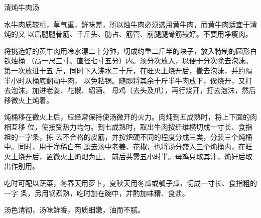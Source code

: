 \begin{recipe}{清炖牛肉汤}

\ingredients


\preparation

水牛肉质较粗，草气重，鲜味差，所以烛牛肉必须选用黄牛肉，而黄牛肉适宜于清炖的又
以后腿腿骨筋、千斤头、肋占、筋管、前腿腿骨筋较好。不要用净瘦肉。

将挑选好的黄牛肉用冷水漂二十分钟，切成约重二斤半的块子，放入特制的圆形白铁烛桶
（高一尺三寸、直径七寸五分）内。须分次放入，以便于分次除去泡沫。第一次放进十五
斤，同时下入沸水二十斤，在旺火上烧开后，撇去泡沫，并约隔半小时从桶底翻动牛肉，
以免粘锅。随即将其余十斤半牛肉放下，俟烧开，又打去泡沫，加进老姜、花椒、绍酒、
母鸡（去头及爪），再行烧开，打去泡沫，然后移微火上炖着。

炖桶移在微火上后，应经常保持使汤微开的火力。肉炖到五成熟时，将上下面的肉相互移
位，使接受热力均匀。到七成熟时，取出牛肉按纤维横切成一寸长、食指祖的一字条，拣
去不合格的皮筋，并按𤆵硬不同的程度分成三类，分装三个炖桶中。同时，用干净稀白布
滤去汤中老姜、花椒，也将汤分盛入三个炖桶内，在旺火上烧开后，置微火上炖𤆵为止。
前后共需五小时半。母鸡只取其汁，炖好后取出作别用。

吃时可配以蔬菜，冬春天用萝卜，夏秋天用冬瓜或瓠子瓜，切成一寸长、食指粗的一字
条，另用锅煮熟，吃时加在碗中，并酌加味精、食盐。

\features

汤色清彻，汤味鲜香，肉质细嫩，油而不腻。

\end{recipe}

